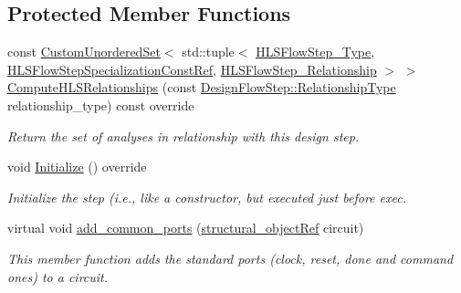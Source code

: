 \subsection*{Protected Member Functions}
\begin{DoxyCompactItemize}
\item 
const \hyperlink{classCustomUnorderedSet}{Custom\+Unordered\+Set}$<$ std\+::tuple$<$ \hyperlink{hls__step_8hpp_ada16bc22905016180e26fc7e39537f8d}{H\+L\+S\+Flow\+Step\+\_\+\+Type}, \hyperlink{hls__step_8hpp_a5fdd2edf290c196531d21d68e13f0e74}{H\+L\+S\+Flow\+Step\+Specialization\+Const\+Ref}, \hyperlink{hls__step_8hpp_a3ad360b9b11e6bf0683d5562a0ceb169}{H\+L\+S\+Flow\+Step\+\_\+\+Relationship} $>$ $>$ \hyperlink{classControllerCreatorBaseStep_a786209eedbc7068e8a8d6f873cf25fc3}{Compute\+H\+L\+S\+Relationships} (const \hyperlink{classDesignFlowStep_a723a3baf19ff2ceb77bc13e099d0b1b7}{Design\+Flow\+Step\+::\+Relationship\+Type} relationship\+\_\+type) const override
\begin{DoxyCompactList}\small\item\em Return the set of analyses in relationship with this design step. \end{DoxyCompactList}\item 
void \hyperlink{classControllerCreatorBaseStep_a1446309080149bf6370ae3a9d1e18feb}{Initialize} () override
\begin{DoxyCompactList}\small\item\em Initialize the step (i.\+e., like a constructor, but executed just before exec. \end{DoxyCompactList}\item 
virtual void \hyperlink{classControllerCreatorBaseStep_aae1b2e6c9d6c8f5b4e3a7b6a26d1d56a}{add\+\_\+common\+\_\+ports} (\hyperlink{structural__objects_8hpp_a8ea5f8cc50ab8f4c31e2751074ff60b2}{structural\+\_\+object\+Ref} circuit)
\begin{DoxyCompactList}\small\item\em This member function adds the standard ports (clock, reset, done and command ones) to a circuit. \end{DoxyCompactList}\end{DoxyCompactItemize}
